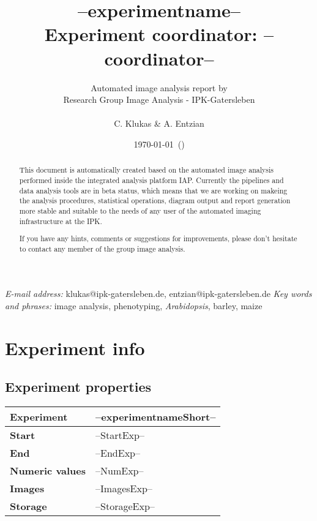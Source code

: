 \documentclass[%
  paper=a4, %
  pagesize, %
  DIV=calc, %
  headings=small,%
  english,   %
  oneside
]{scrartcl}  %
\providecommand{\tabularnewline}{\\}
\begin{document}
\title{--experimentname-- \tabularnewline \vspace{10 mm} \large{Experiment coordinator: --coordinator--}}

\author{Automated image analysis report by\tabularnewline Research
Group Image Analysis - IPK-Gatersleben\tabularnewline \tabularnewline C. Klukas
\& A. Entzian}

\date{\today ~(\currenttime )}

\maketitle
\thispagestyle{empty}  
\begin{abstract}
This document is automatically created based on the automated image analysis performed 
inside the integrated analysis platform IAP. Currently the pipelines and data analysis tools are in beta status, 
which means that we are working on makeing the analysis procedures, statistical operations, diagram output and report
generation more stable and suitable to the needs of any user of the automated imaging infrastructure at the IPK.

If you have any hints, comments or suggestions for improvements, please don't hesitate to contact any member
of the group image analysis.
\end{abstract}
\vfill
\small{\textit{E-mail address:} klukas@ipk-gatersleben.de, entzian@ipk-gatersleben.de}
\newline 
\small{\textit{Key words and phrases:} image analysis, phenotyping, \textit{Arabidopsis}, barley, maize }
 
\addtocounter{page}{-1}
\clearpage
\tableofcontents

\clearpage
\pagestyle{headings}
\section{Experiment info} 
\subsection{Experiment properties}
\begin{center}
	\begin{tabular}{|p{3cm}|p{13cm}|}
	\hline
	{\textbf{Experiment}} & --experimentnameShort--\tabularnewline
	\hline
	\hline
	{\textbf{Start}} & --StartExp--\tabularnewline
	\hline
	{\textbf{End}} & --EndExp--\tabularnewline
	\hline
	{\textbf{Numeric values}} & --NumExp-- \tabularnewline
	\hline
	{\textbf{Images}} & --ImagesExp-- \tabularnewline
	\hline
	{\textbf{Storage}} & --StorageExp-- \tabularnewline
	\hline
	\hline 
	\end{tabular}
\end{center}
\end{document}
